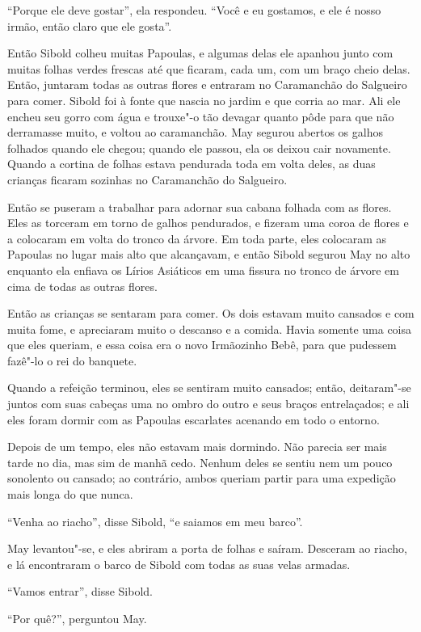 ``Porque ele deve gostar'', ela respondeu. ``Você e eu gostamos, e ele é
nosso irmão, então claro que ele gosta''.

Então Sibold colheu muitas Papoulas, e algumas delas ele apanhou junto
com muitas folhas verdes frescas até que ficaram, cada um, com um braço
cheio delas. Então, juntaram todas as outras flores e entraram no
Caramanchão do Salgueiro para comer. Sibold foi à fonte que nascia no
jardim e que corria ao mar. Ali ele encheu seu gorro com água e trouxe"-o
tão devagar quanto pôde para que não derramasse muito, e voltou ao
caramanchão. May segurou abertos os galhos folhados quando ele chegou;
quando ele passou, ela os deixou cair novamente. Quando a cortina de
folhas estava pendurada toda em volta deles, as duas crianças ficaram
sozinhas no Caramanchão do Salgueiro.

Então se puseram a trabalhar para adornar sua cabana folhada com as
flores. Eles as torceram em torno de galhos pendurados, e fizeram uma
coroa de flores e a colocaram em volta do tronco da árvore. Em toda
parte, eles colocaram as Papoulas no lugar mais alto que alcançavam, e
então Sibold segurou May no alto enquanto ela enfiava os Lírios
Asiáticos em uma fissura no tronco de árvore em cima de todas as outras
flores.

Então as crianças se sentaram para comer. Os dois estavam muito cansados
e com muita fome, e apreciaram muito o descanso e a comida. Havia
somente uma coisa que eles queriam, e essa coisa era o novo Irmãozinho
Bebê, para que pudessem fazê"-lo o rei do banquete.

Quando a refeição terminou, eles se sentiram muito cansados; então,
deitaram"-se juntos com suas cabeças uma no ombro do outro e seus braços
entrelaçados; e ali eles foram dormir com as Papoulas escarlates
acenando em todo o entorno.

Depois de um tempo, eles não estavam mais dormindo. Não parecia ser mais
tarde no dia, mas sim de manhã cedo. Nenhum deles se sentiu nem um pouco
sonolento ou cansado; ao contrário, ambos queriam partir para uma
expedição mais longa do que nunca.

``Venha ao riacho'', disse Sibold, ``e saiamos em meu barco''.

May levantou"-se, e eles abriram a porta de folhas e saíram. Desceram ao
riacho, e lá encontraram o barco de Sibold com todas as suas velas
armadas.

``Vamos entrar'', disse Sibold.

``Por quê?'', perguntou May.

